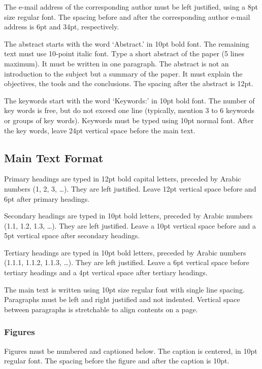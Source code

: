 \documentclass[]{YIC2015}
\begin{document}
The e-mail address of the corresponding author must be left justified, using a 8pt size regular font. The spacing before and after the corresponding author e-mail address is 6pt and 34pt, respectively.

The abstract starts with the word `Abstract.' in 10pt bold font. The remaining text must use 10-point italic font. Type a short abstract of the paper (5 lines maximum). It must be written in one paragraph.  The abstract is not an introduction to the subject but a summary of the paper. It must explain the objectives, the tools and the conclusions. The spacing after the abstract is 12pt.

The keywords start with the word `Keywords:' in 10pt bold font. The number of key words is free, but do not exceed one line (typically, mention 3 to 6 keywords or groups of key words). Keywords must be typed using 10pt normal font. After the key words, leave 24pt vertical space before the main text.

\subsection{Main Text Format}

Primary headings are typed in 12pt bold capital letters, preceded by Arabic numbers (1, 2, 3, \ldots). They are left justified. Leave 12pt vertical space before and 6pt after primary headings.

Secondary headings are typed in 10pt bold letters, preceded by Arabic numbers (1.1, 1.2, 1.3, \ldots).  They are left justified.  Leave a 10pt vertical space before and a 5pt vertical space after secondary headings.

Tertiary headings are typed in 10pt bold letters, preceded by Arabic numbers (1.1.1, 1.1.2, 1.1.3, \ldots).  They are left justified. Leave a 6pt vertical space before tertiary headings and a 4pt vertical space after tertiary headings.

The main text is written using 10pt size regular font with single line spacing. Paragraphs must be left and right justified and not indented. Vertical space between paragraphs is stretchable to align contents on a page.

\subsubsection{Figures}
Figures must be numbered and captioned below. The caption is centered, in 10pt regular font. The spacing before the figure and after the caption is 10pt.
\end{document}
